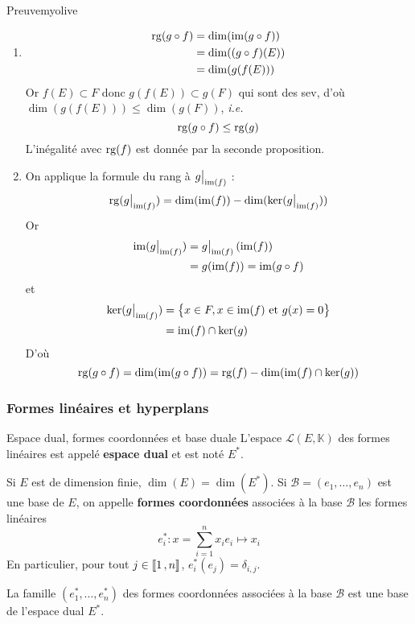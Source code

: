     \begin{demo}{Preuve}{myolive}
        \begin{enumerate}
            \item \begin{align*}
                \operatorname{rg}(g \circ f)
                &= \dim(\operatorname{im}(g \circ f)) \\
                &= \dim((g \circ f)(E)) \\
                &= \dim(g(f(E)))
            \end{align*}
            Or $f(E) \subset F$ donc $g(f(E)) \subset g(F)$ qui sont des sev, d’où $\dim(g(f(E))) \leq \dim(g(F))$, \textit{i.e.}
            \[ \operatorname{rg}(g \circ f) \leq \operatorname{rg}(g) \]
            L’inégalité avec $\operatorname{rg}(f)$ est donnée par la seconde proposition.
            \item On applique la formule du rang à $\restr{g}{\im(f)}$ :
            \[ \rg(\restr{g}{\im(f)}) = \dim(\im(f)) - \dim(\ker(\restr{g}{\im(f)})) \]   
            Or \begin{align*}
                \im(\restr{g}{\im(f)}) 
                &= \restr{g}{\im(f)}\left(\im(f)\right) \\
                &= g(\im(f)) = \im(g \circ f)
            \end{align*}
            et \begin{align*}
                \ker(\restr{g}{\im(f)}) 
                &= \big\{ x \in F, x \in \im(f) \text{ et } g(x) = 0 \big\} \\
                &= \im(f) \cap \ker(g)
            \end{align*}
            D’où 
            \[ \operatorname{rg}(g \circ f) = \dim(\operatorname{im}(g \circ f)) = \operatorname{rg}(f) - \dim(\operatorname{im}(f) \cap \ker(g)) \]
        \end{enumerate}
    \end{demo}

    \subsubsection{Formes linéaires et hyperplans}

    \begin{defitheo}{Espace dual, formes coordonnées et base duale}{}
        L’espace $\mathcal{L}(E,\mathbb{K})$ des formes linéaires est appelé \textbf{espace dual} et est noté $E^*$. 

        Si $E$ est de dimension finie, $\dim(E) = \dim(E^*)$. Si $\mathcal{B}= (e_1,\ldots,e_n)$ est une base de $E$, on appelle \textbf{formes coordonnées} associées à la base $\mathcal{B}$ les formes linéaires 
        \[ e_i^* : x =\sum_{i=1}^{n} x_i e_i \longmapsto x_i \]    
        En particulier, pour tout $j \in \left\llbracket 1 \, , n \right\rrbracket$, $e_i^*(e_j) = \delta_{i,j}$. 

        La famille $(e_1^*, \ldots, e_n^*)$ des formes coordonnées associées à la base $\mathcal{B}$ est une base de l’espace dual $E^*$.
    \end{defitheo}

